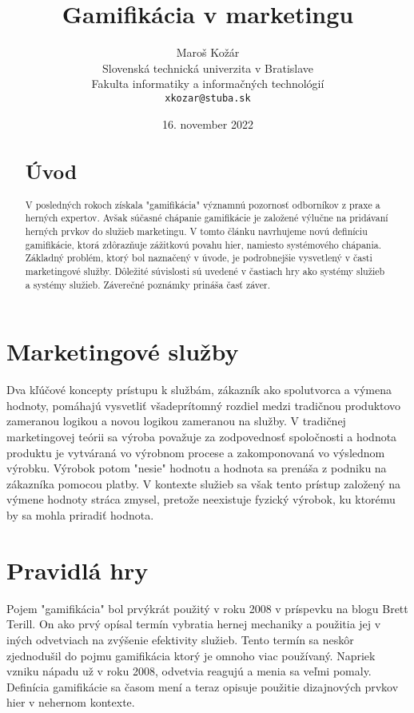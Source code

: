 \documentclass[10pt,oneside,slovak]{article}
\title{Gamifikácia v marketingu}
\author{Maroš Kožár\\[2pt]
	{\small Slovenská technická univerzita v Bratislave}\\
	{\small Fakulta informatiky a informačných technológií}\\
	{\small \texttt{xkozar@stuba.sk}}}
\date{\small 16. november 2022}
\begin{document}
\maketitle
\begin{abstract}
\section{Úvod}
V posledných rokoch získala "gamifikácia" významnú pozornosť odborníkov z praxe a herných expertov.
Avšak súčasné chápanie gamifikácie je založené výlučne na pridávaní herných prvkov do služieb marketingu.
V tomto článku navrhujeme novú definíciu gamifikácie, ktorá zdôrazňuje zážitkovú povahu hier, namiesto systémového chápania.
Základný problém, ktorý bol naznačený v úvode, je podrobnejšie vysvetlený v časti marketingové služby.
Dôležité súvislosti sú uvedené v častiach hry ako systémy služieb a systémy služieb.
Záverečné poznámky prináša časť záver.
\end{abstract}

\section{Marketingové služby} \label{nejaka}

\begin{figure*}[tbh]
\centering
Dva kľúčové koncepty prístupu k službám, zákazník ako spolutvorca a výmena hodnoty, pomáhajú vysvetliť všadeprítomný rozdiel medzi tradičnou produktovo zameranou logikou a novou  logikou zameranou na služby.
V tradičnej marketingovej teórii sa výroba považuje za zodpovednosť spoločnosti
a hodnota produktu je vytváraná vo výrobnom procese a zakomponovaná vo výslednom výrobku. Výrobok potom "nesie"
hodnotu a hodnota sa prenáša z podniku na
zákazníka pomocou platby. V kontexte služieb sa však tento
prístup založený na výmene hodnoty stráca zmysel, pretože neexistuje
fyzický výrobok, ku ktorému by sa mohla priradiť hodnota.
\end{figure*}

\section{Pravidlá hry} \label{ina}

Pojem "gamifikácia" bol prvýkrát použitý v roku 2008 v príspevku na blogu
Brett Terill. On ako prvý opísal termín vybratia hernej mechaniky a použitia jej v iných odvetviach na zvýšenie efektivity služieb. Tento termín sa neskôr zjednodušil do pojmu gamifikácia ktorý je omnoho viac používaný. Napriek vzniku nápadu už v roku 2008, odvetvia reagujú a menia sa veľmi pomaly. Definícia gamifikácie sa časom mení a teraz opisuje použitie dizajnových prvkov hier v nehernom kontexte.
\end{document}
